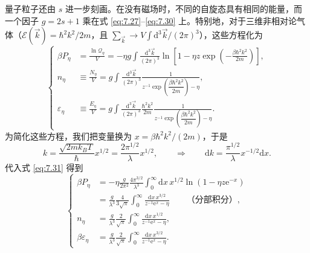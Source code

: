 量子粒子还由 $s$ 进一步刻画。在没有磁场时，不同的自旋态具有相同的能量，而一个因子 $g=2s+1$ 乘在式 \eqref{eq:7.27}--\eqref{eq:7.30} 上。特别地，对于三维非相对论气体（$\mathcal E(\vec k)=\hbar^2k^2/2m$，且 $\sum_{\vec k}\to V\int\mathrm d^3\vec k/(2\pi)^3$），这些方程化为
\begin{equation}\label{eq:7.31}
\left\{\begin{aligned}
\beta P_\eta&=\frac{\ln\mathcal Q_\eta}V=-\eta g\int\frac{\mathrm d^3\vec k}{(2\pi)^3}\ln\left[1-\eta z\exp\left(-\frac{\beta\hbar^2k^2}{2m}\right)\right],\\[1ex]
n_\eta&\equiv\frac{N_\eta}V=g\int\frac{\mathrm d^3\vec k}{(2\pi)^3}\frac1{z^{-1}\exp\left(\dfrac{\beta\hbar^2k^2}{2m}\right)-\eta},\\[1ex]
\varepsilon_\eta&\equiv\frac{E_\eta}V=g\int\frac{\mathrm d^3\vec k}{(2\pi)^3}\frac{\hbar^2k^2}{2m}\frac1{z^{-1}\exp\left(\dfrac{\beta\hbar^2k^2}{2m}\right)-\eta}.
\end{aligned}\right.
\end{equation}
为简化这些方程，我们把变量换为 $x=\beta\hbar^2k^2/(2m)$，于是
\begin{equation*}
k=\frac{\sqrt{2mk_BT}}{\hbar}x^{1/2}=\frac{2\pi^{1/2}}{\lambda}x^{1/2},\qquad\Longrightarrow\qquad\mathrm dk=\frac{\pi^{1/2}}{\lambda}x^{-1/2}\mathrm dx.
\end{equation*}
代入式 \eqref{eq:7.31} 得到
\begin{equation}\label{eq:7.32}
\left\{\begin{aligned}
\beta P_\eta&=-\eta\frac{g}{2\pi^2}\frac{4\pi^{3/2}}{\lambda^3}\int_0^\infty\mathrm dx\,x^{1/2}\ln\left(1-\eta z\mathrm e^{-x}\right)\\
&=\frac{g}{\lambda^3}\frac4{3\sqrt\pi}\int_0^\infty\frac{\mathrm dx\,x^{3/2}}{z^{-1}\mathrm e^x-\eta}\qquad\text{（分部积分）},\\[1ex]
n_\eta&=\frac{g}{\lambda^3}\frac2{\sqrt\pi}\int_0^\infty\frac{\mathrm dx\,x^{1/2}}{z^{-1}\mathrm e^x-\eta},\\[1ex]
\beta\varepsilon_\eta&=\frac{g}{\lambda^3}\frac2{\sqrt\pi}\int_0^\infty\frac{\mathrm dx\,x^{3/2}}{z^{-1}\mathrm e^x-\eta}.
\end{aligned}\right.
\end{equation}


